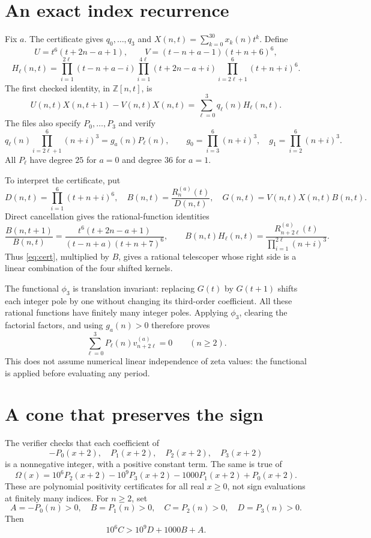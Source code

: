 \documentclass[11pt]{article}
\newcommand{\Z}{\mathbb Z}
\begin{document}
\section{An exact index recurrence}
Fix $a$. The certificate gives $q_0,\ldots,q_3$ and
$X(n,t)=\sum_{k=0}^{30}x_k(n)t^k$. Define
\[
 U=t^6(t+2n-a+1),\qquad V=(t-n+a-1)(t+n+6)^6,
\]
\[
 H_\ell(n,t)=
 \prod_{i=1}^{2\ell}(t-n+a-i)
 \prod_{i=1}^{4\ell}(t+2n-a+i)
 \prod_{i=2\ell+1}^{6}(t+n+i)^6.
\]
The first checked identity, in $\Z[n,t]$, is
\begin{equation}
 U(n,t)X(n,t+1)-V(n,t)X(n,t)
           =\sum_{\ell=0}^3q_\ell(n)H_\ell(n,t).
 \label{eq:cert}
\end{equation}
The files also specify $P_0,\ldots,P_3$ and verify
\[
 q_\ell(n)\prod_{i=2\ell+1}^{6}(n+i)^3=g_a(n)P_\ell(n),\qquad
 g_0=\prod_{i=3}^6(n+i)^3,\quad g_1=\prod_{i=2}^6(n+i)^3.
\]
All $P_\ell$ have degree $25$ for $a=0$ and degree $36$ for $a=1$.

To interpret the certificate, put
\[
 D(n,t)=\prod_{i=1}^6(t+n+i)^6,\quad
 B(n,t)=\frac{R_n^{(a)}(t)}{D(n,t)},\quad G(n,t)=V(n,t)X(n,t)B(n,t).
\]
Direct cancellation gives the rational-function identities
\[
 \frac{B(n,t+1)}{B(n,t)}
 =\frac{t^6(t+2n-a+1)}{(t-n+a)(t+n+7)^6},
 \qquad
 B(n,t)H_\ell(n,t)=
 \frac{R_{n+2\ell}^{(a)}(t)}{\prod_{i=1}^{2\ell}(n+i)^3}.
\]
Thus \eqref{eq:cert}, multiplied by $B$, gives a rational telescoper
whose right side is a linear combination of the four shifted kernels.

The functional $\phi_3$ is translation invariant: replacing $G(t)$ by
$G(t+1)$ shifts each integer pole by one without changing its third-order
coefficient. All these rational functions have finitely many integer poles.
Applying $\phi_3$, clearing the factorial factors, and using $g_a(n)>0$
therefore proves
\begin{equation}
 \sum_{\ell=0}^3P_\ell(n)v_{n+2\ell}^{(a)}=0\qquad(n\ge2).
 \label{eq:rec}
\end{equation}
This does not assume numerical linear independence of zeta values:
the functional is applied before evaluating any period.

\section{A cone that preserves the sign}
The verifier checks that each coefficient of
\[
 -P_0(x+2),\quad P_1(x+2),\quad P_2(x+2),\quad P_3(x+2)
\]
is a nonnegative integer, with a positive constant term. The same is true of
\[
 \Omega(x)=10^6P_2(x+2)-10^9P_3(x+2)-1000P_1(x+2)+P_0(x+2).
\]
These are polynomial positivity certificates for all real $x\ge0$,
not sign evaluations at finitely many indices. For $n\ge2$, set
\[
 A=-P_0(n)>0,\quad B=P_1(n)>0,\quad C=P_2(n)>0,\quad D=P_3(n)>0.
\]
Then
\begin{equation}
 10^6 C>10^9D+1000B+A.
 \label{eq:cone}
\end{equation}
\end{document}

